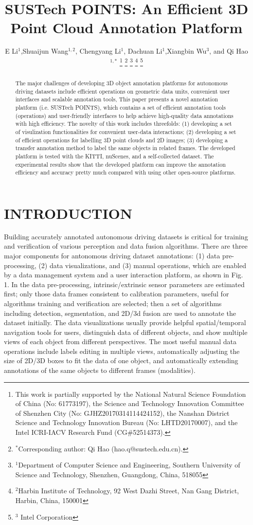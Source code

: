 \documentclass[letterpaper, 10 pt, conference]{ieeeconf}  %
\title{\LARGE \bf
SUSTech POINTS: An Efficient 3D Point Cloud Annotation Platform
}
\author{E Li$^{1}$,Shuaijun Wang$^{1,2}$,  Chengyang Li$^{1}$, Dachuan Li$^{1}$,Xiangbin Wu$^{3}$, and Qi Hao$^{1,*}$%
\thanks{This work is partially supported by the National Natural Science Foundation of China (No: 61773197), the Science and Technology Innovation Committee of Shenzhen City (No: GJHZ20170314114424152), the Nanshan District Science and Technology Innovation Bureau (No: LHTD20170007), and the Intel ICRI-IACV Research Fund (CG$\#$52514373).}
\thanks{$^{*}$Corresponding author: Qi Hao (hao.q@sustech.edu.cn).}
\thanks{$^{1}$Department of Computer Science and Engineering,
Southern University of Science and Technology, Shenzhen, Guangdong, China, 518055}
\thanks{$^{2}$Harbin Institute of Technology,
92 West Dazhi Street, Nan Gang District, Harbin, China, 150001}%
\thanks{$^{3}$ Intel Corporation}%
}
\begin{document}
\maketitle
\thispagestyle{empty}
\pagestyle{empty}
\begin{abstract}


The major challenges of developing 3D object annotation platforms for autonomous driving datasets 
include efficient operations on geometric data units, convenient user interfaces and scalable annotation tools, This paper presents a novel annotation platform (i.e. SUSTech POINTS), which contains a set of efficient annotation tools (operations) and user-friendly interfaces to help achieve high-quality data annotations with high efficiency.
The novelty of this work includes threefolds: 
(1) developing a set of visulization functionalities for convenient user-data interactions;
(2) developing a set of efficient operations for labelling 3D point clouds and 2D images; 
(3) developing a transfer annotation method to label the same objects in related frames. 
The developed platform is tested with the KITTI, nuScenes, and a self-collected dataset. 
The experimental results show that the developed platform can improve the annotation efficiency and accuracy pretty much 
compared with using other open-source platforms.
\end{abstract}






\section{INTRODUCTION}


Building accurately annotated autonomous driving datasets is critical for training and verification of various perception and data fusion algorithms. There are three major components for antonomous driving dataset annotations: (1) data pre-processing, (2) data visualizations, and (3) manual operations, which are enabled by a data management system and a user interaction platform, as shown in Fig. 1. In the data pre-processing, intrinsic/extrinsic sensor parameters are estimated first; only those data frames consistent to calibration parameters, useful for algorithms training and verification are selected; then a set of algorithms including detection, segmentation, and 2D/3d fusion are used to annotate the dataset initially. The data visualizations usually provide helpful spatial/temporal navigation tools for users, distinguish data of different objects, and show multiple views of each object from different perspectives. The most useful manual data operations include labels editing in multiple views, automatically adjusting the size of 2D/3D boxes to fit the data of one object, and automatically extending annotations of the same objects to different frames (modalities).
\end{document}
